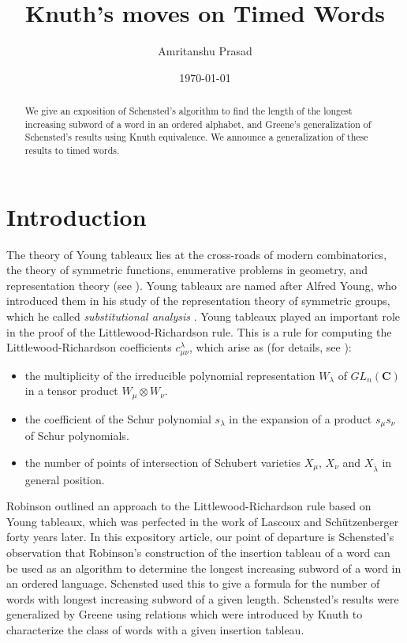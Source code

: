\documentclass[10pt]{amsproc}
\title{Knuth's moves on Timed Words}
\author{Amritanshu Prasad}
\date{\today}
\theoremstyle{definition}
\theoremstyle{remark}
\begin{document}
\begin{abstract}
  We give an exposition of Schensted's algorithm to find the length of the longest increasing subword of a word in an ordered alphabet, and Greene's generalization of Schensted's results using Knuth equivalence.
  We announce a generalization of these results to timed words.
\end{abstract}
\maketitle
{}
\section{Introduction}
\label{sec:introduction}
The theory of Young tableaux lies at the cross-roads of modern combinatorics, the theory of symmetric functions, enumerative problems in geometry, and representation theory (see \cite{fulton,manivel,rtcv,schur_poly}).
Young tableaux are named after Alfred Young, who introduced them in his study of the representation theory of symmetric groups, which he called \emph{substitutional analysis} \cite{doi:10.1112/plms/s1-33.1.97}.
Young tableaux played an important role in the proof of the Littlewood-Richardson rule.
This is a rule for computing the Littlewood-Richardson coefficients $c^\lambda_{\mu\nu}$, which arise as (for details, see \cite{fulton,manivel}):
\begin{itemize}
\item the multiplicity of the irreducible polynomial representation $W_\lambda$ of $GL_n(\mathbf C)$ in a tensor product $W_\mu\otimes W_\nu$.
\item the coefficient of the Schur polynomial $s_\lambda$ in the expansion of a product $s_\mu s_\nu$ of Schur polynomials.
\item the number of points  of intersection of Schubert varieties $X_\mu$, $X_\nu$ and $X_{\check\lambda}$ in general position.
\end{itemize}
Robinson \cite{robinson-algo} outlined an approach to the Littlewood-Richardson rule based on Young tableaux, which was perfected in the work of Lascoux and Sch\"utzenberger \cite{plaxique} forty years later.
In this expository article, our point of departure is Schensted's observation \cite{schensted} that Robinson's construction of the  insertion tableau of a word can be used as an algorithm to determine the longest increasing subword of a word in an ordered language.
Schensted used this to give a formula for the number of words with longest increasing subword of a given length.
Schensted's results were generalized by Greene \cite{Greene-schen} using relations which were introduced by Knuth \cite{knuth} to characterize the class of words with a given insertion tableau.
\end{document}
